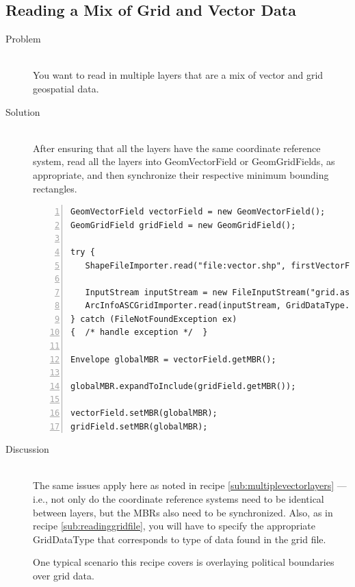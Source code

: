 \documentclass[twoside,10pt]{book}
\newcommand\class[1]{\index{Classes!{#1}}\textsf{#1}}
\begin{document}
\subsection{Reading a Mix of Grid and Vector Data}
\label{sub:readingmixofdata}

\begin{description}
\item[Problem]~\\
You want to read in multiple layers that are a mix of vector and grid geospatial data.

\item[Solution]~\\
After ensuring that all the layers have the same coordinate reference system, read all the layers into GeomVectorField or GeomGridFields, as appropriate, and then synchronize their respective minimum bounding rectangles.
\begin{Verbatim}[frame=lines,framesep=5mm,numbers=left,commandchars=+\[\]]
GeomVectorField vectorField = new GeomVectorField();
GeomGridField gridField = new GeomGridField();

try {
   ShapeFileImporter.read("file:vector.shp", firstVectorField);

   InputStream inputStream = new FileInputStream("grid.asc");
   ArcInfoASCGridImporter.read(inputStream, GridDataType.INTEGER, gridField);
} catch (FileNotFoundException ex)
{  /* handle exception */  }

Envelope globalMBR = vectorField.getMBR();

globalMBR.expandToInclude(gridField.getMBR());

vectorField.setMBR(globalMBR);
gridField.setMBR(globalMBR);
\end{Verbatim}

\item[Discussion ]~\\
The same issues apply here as noted in recipe
\ref{sub:multiplevectorlayers} --- i.e., not only do the coordinate
reference systems need to be identical between layers, but the MBRs
also need to be synchronized.  Also, as in recipe
\ref{sub:readinggridfile}, you will have to specify the appropriate
\class{GridDataType} that corresponds to type of data found in the
grid file.

One typical scenario this recipe covers is overlaying political
boundaries over grid data.
\end{description}



\end{document}

